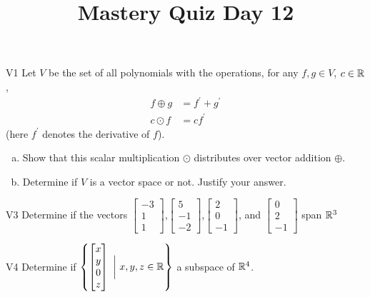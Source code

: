 \documentclass{sbgLAquiz}
\title{Mastery Quiz Day 12 }
\begin{document}
\begin{problem}{V1}
Let $V$ be the set of all polynomials with the operations, for any $f, g \in V$, $c \in \mathbb{R}$,
\begin{align*}
f \oplus g &= f^\prime + g^\prime \\
c \odot f &= c f^\prime
\end{align*}
(here $f^\prime$ denotes the derivative of $f$).
\begin{enumerate}[(a)]
\item Show that this scalar multiplication $\odot$ distributes over vector addition $\oplus$.
\item Determine if $V$ is a vector space or not.  Justify your answer.
\end{enumerate}
\end{problem}

\begin{problem}{V3}
Determine if the vectors  $\begin{bmatrix} -3 \\ 1 \\ 1 \end{bmatrix}$,$\begin{bmatrix} 5 \\ -1 \\ -2 \end{bmatrix}$,$\begin{bmatrix}2 \\ 0 \\ -1 \end{bmatrix}$, and $\begin{bmatrix} 0 \\ 2 \\ -1\end{bmatrix}$ span $\mathbb{R}^3$
\end{problem}
\newpage

\begin{problem}{V4}
Determine if $\left\{ \begin{bmatrix} x \\ y \\ 0 \\ z \end{bmatrix}\  \bigg|\ x,y,z \in \mathbb{R}\right\}$  a subspace of $\mathbb{R}^4$.
\end{problem}
\end{document}
